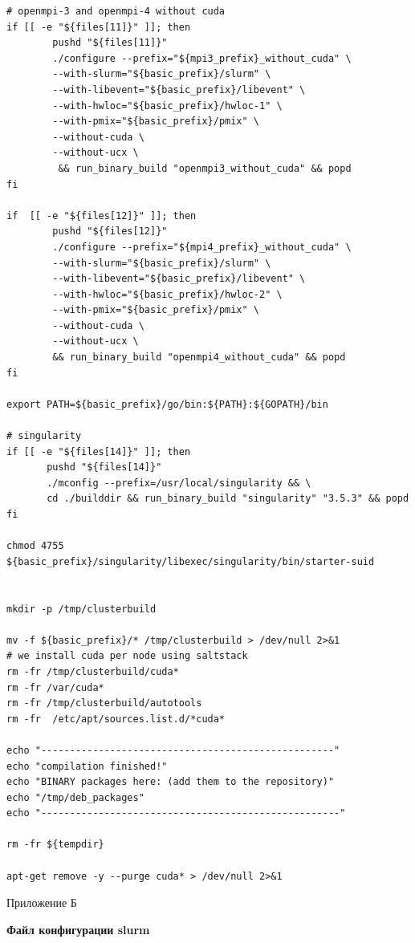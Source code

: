 \documentclass[a4paper]{extarticle}
\begin{document}
\begin{verbatim}
# openmpi-3 and openmpi-4 without cuda
if [[ -e "${files[11]}" ]]; then
        pushd "${files[11]}"
        ./configure --prefix="${mpi3_prefix}_without_cuda" \
        --with-slurm="${basic_prefix}/slurm" \
        --with-libevent="${basic_prefix}/libevent" \
        --with-hwloc="${basic_prefix}/hwloc-1" \
        --with-pmix="${basic_prefix}/pmix" \
        --without-cuda \
        --without-ucx \
         && run_binary_build "openmpi3_without_cuda" && popd
fi

if  [[ -e "${files[12]}" ]]; then
        pushd "${files[12]}"
        ./configure --prefix="${mpi4_prefix}_without_cuda" \
        --with-slurm="${basic_prefix}/slurm" \
        --with-libevent="${basic_prefix}/libevent" \
        --with-hwloc="${basic_prefix}/hwloc-2" \
        --with-pmix="${basic_prefix}/pmix" \
        --without-cuda \
        --without-ucx \
        && run_binary_build "openmpi4_without_cuda" && popd
fi

export PATH=${basic_prefix}/go/bin:${PATH}:${GOPATH}/bin

# singularity
if [[ -e "${files[14]}" ]]; then
       pushd "${files[14]}"
       ./mconfig --prefix=/usr/local/singularity && \
       cd ./builddir && run_binary_build "singularity" "3.5.3" && popd
fi

chmod 4755 ${basic_prefix}/singularity/libexec/singularity/bin/starter-suid


mkdir -p /tmp/clusterbuild

mv -f ${basic_prefix}/* /tmp/clusterbuild > /dev/null 2>&1
# we install cuda per node using saltstack
rm -fr /tmp/clusterbuild/cuda*
rm -fr /var/cuda*
rm -fr /tmp/clusterbuild/autotools
rm -fr  /etc/apt/sources.list.d/*cuda*

echo "---------------------------------------------------"
echo "compilation finished!"
echo "BINARY packages here: (add them to the repository)"
echo "/tmp/deb_packages"
echo "----------------------------------------------------"

rm -fr ${tempdir}

apt-get remove -y --purge cuda* > /dev/null 2>&1
\end{verbatim}

\newpage

\begin{flushright}Приложение 	Б\end{flushright}
\centerline{\textbf{Файл конфигурации slurm}}
\end{document}

